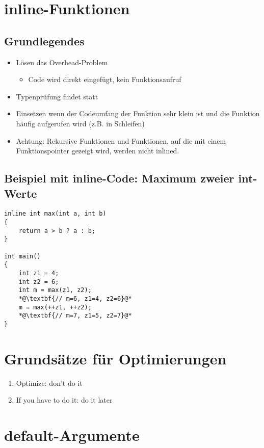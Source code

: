 \section{inline-Funktionen}
\label{sec:inline}

\subsection{Grundlegendes}
\begin{itemize}
	\item Lösen das Overhead-Problem
	\begin{itemize}
		\item Code wird direkt eingefügt, kein Funktionsaufruf
	\end{itemize}
	\item Typenprüfung findet statt
	\item Einsetzen wenn der Codeumfang der Funktion sehr klein ist und die Funktion häufig aufgerufen wird (z.B. in Schleifen)
	\item Achtung: Rekursive Funktionen und Funktionen, auf die mit einem Funktionspointer gezeigt wird, werden nicht inlined.
\end{itemize}

\subsection{Beispiel mit inline-Code: Maximum zweier int-Werte}
\noindent
\begin{minipage}{0.4\linewidth}
\begin{lstlisting}
inline int max(int a, int b)
{
	return a > b ? a : b;
}

int main()
{
	int z1 = 4;
	int z2 = 6;
	int m = max(z1, z2);
	*@\textbf{// m=6, z1=4, z2=6}@*
	m = max(++z1, ++z2);
	*@\textbf{// m=7, z1=5, z2=7}@*
}
\end{lstlisting}
\end{minipage}

\section{Grundsätze für Optimierungen}
\begin{enumerate}
	\item Optimize: don't do it
	\item If you have to do it: do it later
\end{enumerate} 

\section{default-Argumente}

